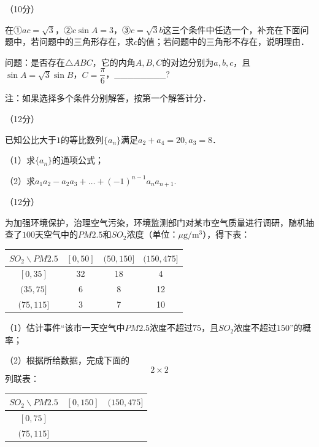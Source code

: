 \documentclass[a4paper,11pt]{report}
\begin{document}
\begin{examanswers}[start=17]

\item（10分）

在①$ac=\sqrt{3}$，②$c\ensuremath{\sin A}=3$，③$c=\sqrt{3}b$这三个条件中任选一个，补充在下面问题中，若问题中的三角形存在，求$c$的值；若问题中的三角形不存在，说明理由．

问题：是否存在$\ensuremath{\triangle}ABC$，它的内角$A,B,C$的对边分别为$a,b,c$，且$\ensuremath{\sin A}=\sqrt{3}\ensuremath{\sin B}$，$C=\dfrac{\pi}{6}$，\_\_\_\_\_\_\_\_?

注：如果选择多个条件分别解答，按第一个解答计分．

\item（12分）

已知公比大于$1$的等比数列$\{a_{n}\}$满足$a_{2}+a_{4}=20,a_{3}=8$．

（1）求$\{a_{n}\}$的通项公式；

（2）求$a_{1}a_{2}-a_{2}a_{3}+\ensuremath{\ldots}+(-1)^{n-1}a_{n}a_{n+1}$.

\item（12分）

为加强环境保护，治理空气污染，环境监测部门对某市空气质量进行调研，随机抽查了$100$天空气中的$PM2.5$和$SO_{2}$浓度（单位：$\mu\mathrm{g}/\mathrm{m}^3$），得下表：

\begin{tightcenter}
\begin{tabular}{|c|c|c|c|}
\hline
$SO_2\backslash PM2.5$ & $[0,50]$ & $(50,150]$ & $(150,475]$\\ \hline
$[0,35]$ & 32 & 18 & 4\\ \hline
$(35,75]$ & 6 & 8 & 12\\ \hline
$(75,115]$ & 3 & 7 & 10\\ \hline
\end{tabular}
\end{tightcenter}

（1）估计事件``该市一天空气中$PM2.5$浓度不超过$75$，且$SO_{2}$浓度不超过$150$''的概率；

（2）根据所给数据，完成下面的$$2\times2$$列联表：

\begin{tightcenter}
\begin{tabular}{|c|c|c|}
\hline
$SO_2\backslash PM2.5$ & $[0,150]$ & $(150,475]$\\ \hline
$[0,75]$ &  & \\ \hline
$(75,115]$ &  & \\ \hline
\end{tabular}
\end{tightcenter}


\end{examanswers}
\end{document}
